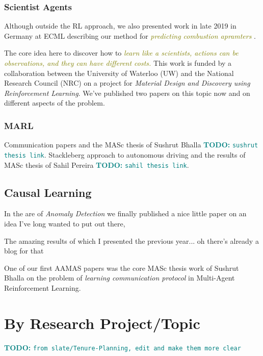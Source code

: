 \documentclass{article}
\newcommand*{\bla}[1]{\textit{\textcolor{olive}{#1}}}
\newcommand{\todo}[1]{\textcolor{teal}{\textbf{TODO: } \texttt{#1}}}
\begin{document}
\subsubsection{Scientist Agents}
Although outside the RL approach, we also presented work in late 2019 in Germany at ECML describing our method for \bla{predicting combustion apramters} \cite{bhalla2019ecml}.

The core idea here to discover how to \bla{learn like a scientists, actions can be observations, and they can have different costs.}
This work is funded by a collaboration between the University of Waterloo (UW) and the National Research Council (NRC) on a project for \emph{Material Design and Discovery using Reinforcement Learning}.
We've published two papers on this topic now \cite{bellinger2020reinforcement} and \cite{bellinger2021canai} on different aspects of the problem.


\subsubsection{MARL}
Communication papers \cite{Bhalla2019aamas} and the MASc thesis of Sushrut Bhalla \todo{sushrut thesis link}.
Stackleberg approach to autonomous driving and the results of MASc thesis of Sahil Pereira \todo{sahil thesis link}.




\subsection{Causal Learning}

In the are of \textit{Anomaly Detection} we finally published a nice little paper on an idea I've long wanted to put out there, \citep*{ganapathisubramanian2021aamas} 


The amazing results of \citep*{bhalla2019ecml} which I presented the previous year... oh there's already a blog for that

One of our first AAMAS papers was the core MASc thesis work of Sushrut Bhalla \citep*{Bhalla2019aamas} on the problem of \textit{learning communication protocol} in Multi-Agent Reinforcement Learning.

\section{By Research Project/Topic}

\todo{from slate/Tenure-Planning, edit and make them more clear}
\end{document}
